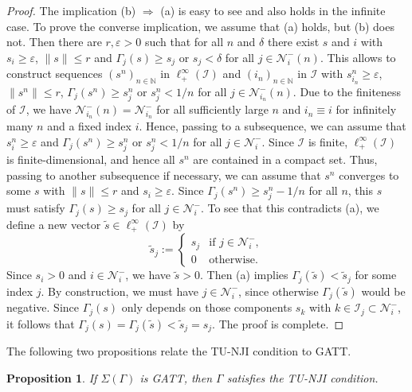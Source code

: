 \documentclass[10pt, oneside, a4paper]{article}
\newcommand{\N}{\mathbb{N}}
\newcommand{\ep}{\varepsilon}
\newcommand{\IC}{\mathcal{I}}
\newcommand{\NC}{\mathcal{N}}
\newtheorem{proposition}{Proposition}[section]
\begin{document}
\begin{proof}
The implication (b) $\Rightarrow$ (a) is easy to see and also holds in the infinite case. To prove the converse implication, we assume that (a) holds, but (b) does not. Then there are $r,\ep > 0$ such that for all $n$ and $\delta$ there exist $s$ and $i$ with $s_i \geq \ep$, $\|s\| \leq r$ and $\Gamma_j(s) \geq s_j$ or $s_j < \delta$ for all $j \in \NC^-_i(n)$. This allows to construct sequences $(s^n)_{n \in \N}$ in $\ell^{\infty}_+(\IC)$ and $(i_n)_{n \in \N}$ in $\IC$ with $s^n_{i_n} \geq \ep$, $\|s^n\| \leq r$, $\Gamma_j(s^n) \geq s^n_j$ or $s^n_j < 1/n$ for all $j \in \NC^-_{i_n}(n)$. Due to the finiteness of $\IC$, we have $\NC^-_{i_n}(n) = \NC^-_{i_n}$ for all sufficiently large $n$ and $i_n \equiv i$ for infinitely many $n$ and a fixed index $i$. Hence, passing to a subsequence, we can assume that $s^n_i \geq \ep$ and $\Gamma_j(s^n) \geq s^n_j$ or $s^n_j < 1/n$ for all $j \in \NC^-_i$. Since $\IC$ is finite, $\ell^{\infty}_+(\IC)$ is finite-dimensional, and hence all $s^n$ are contained in a compact set. Thus, passing to another subsequence if necessary, we can assume that $s^n$ converges to some $s$ with $\|s\| \leq r$ and $s_i \geq \ep$. Since $\Gamma_j(s^n) \geq s^n_j - 1/n$ for all $n$, this $s$ must satisfy $\Gamma_j(s) \geq s_j$ for all $j \in \NC^-_i$. To see that this contradicts (a), we define a new vector $\tilde{s} \in \ell^{\infty}_+(\IC)$ by%
\begin{equation*}
  \tilde{s}_j := \left\{\begin{array}{cc}
                           s_j & \mbox{if } j \in \NC^-_i, \\
													   0 & \mbox{otherwise}.
													\end{array}\right.%
\end{equation*}
Since $s_i > 0$ and $i \in \NC^-_i$, we have $\tilde{s} > 0$. Then (a) implies $\Gamma_j(\tilde{s}) < \tilde{s}_j$ for some index $j$. By construction, we must have $j \in \NC^-_i$, since otherwise $\Gamma_j(\tilde{s})$ would be negative. Since $\Gamma_j(s)$ only depends on those components $s_k$ with $k \in \IC_j \subset \NC^-_i$, it follows that $\Gamma_j(s) = \Gamma_j(\tilde{s}) < \tilde{s}_j = s_j$. The proof is complete.
\end{proof}

The following two propositions relate the TU-NJI condition to GATT.%

\begin{proposition}\label{prop_GATT_implies_uniform_NJI}
If $\Sigma(\Gamma)$ is GATT, then $\Gamma$ satisfies the TU-NJI condition.
\end{proposition}
\end{document}
